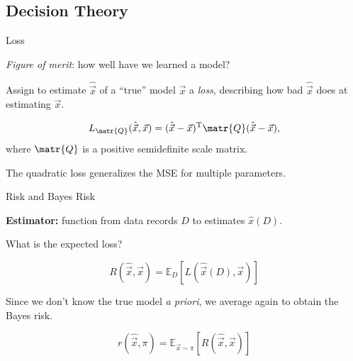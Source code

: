 \documentclass[xcolor=dvipsnames, compress]{beamer}
\newcommand{\T}{\mathrm{T}}
\newcommand{\expect}{\mathbb{E}}
\begin{document}
\subsection{Decision Theory}

\begin{frame}{Loss}
 
  \emph{Figure of merit}: how well have we learned a model?

  Assign to estimate $\hat{\vec{x}}$ of
  a ``true'' model $\vec{x}$ a \emph{loss}, describing how bad
  $\hat{\vec{x}}$ does at estimating $\vec{x}$.
 
  \pause
 
  \begin{definition}
  
    \[
      L_{\matr{Q}}(\hat{\vec{x}}, \vec{x}) = (\hat{\vec{x}} - \vec{x})^{\T} \matr{Q} (\hat{\vec{x}} - \vec{x}),
    \]
    where $\matr{Q}$ is a positive semidefinite scale matrix.

   
  \end{definition}

  \pause
  
  The quadratic loss generalizes the MSE for multiple
  parameters.
 
\end{frame}

\begin{frame}{Risk and Bayes Risk}
  
    \textbf{Estimator:} function from
    data records $D$ to estimates $\hat{x}(D)$.

    What is the expected loss?
    
    \pause
    
    \begin{definition}[Risk]
      $$R(\hat{\vec{x}}, \vec{x}) = \expect_D [L(\hat{\vec{x}}(D), \vec{x})]$$
    \end{definition}
    
    \pause
    
    Since we don't know the true model \emph{a priori}, we average again to obtain
    the Bayes risk.
    
    \pause
    
    \begin{definition}
      \[
	r(\hat{\vec{x}}, \pi) = \expect_{\vec{x} \sim \pi}[R(\hat{\vec{x}}, \vec{x})]
      \]
    \end{definition}
  
\end{frame}
\end{document}

